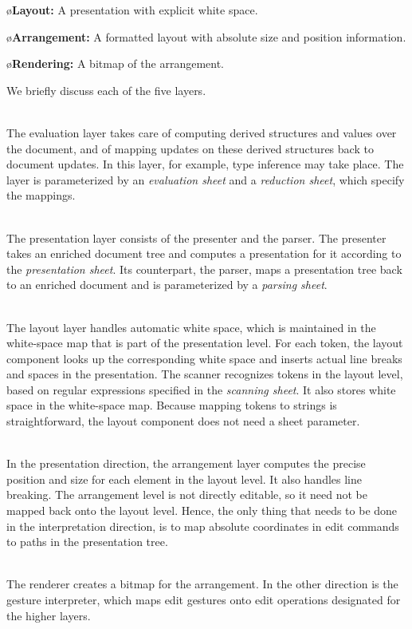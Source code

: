 \documentclass[10pt]{article}
\begin{document}
\o{\bf Layout:} A presentation with explicit white space. 

\o{\bf Arrangement:} A formatted layout with absolute size and position information.

\o{\bf Rendering:} A bitmap of the arrangement.
\el


\bc
We briefly discuss each of the five layers.

\\
The evaluation layer takes care of computing derived structures and values over the document, and of mapping updates on these derived structures back to document updates. In this layer, for example, type inference may take place. The layer is parameterized by an {\em evaluation sheet} and a {\em reduction sheet}, which specify the mappings. 

\\
The presentation layer consists of the presenter and the parser. The presenter takes an enriched document tree and computes a presentation for it according to the {\em presentation sheet}. Its counterpart, the parser, maps a presentation tree back to an enriched document and is parameterized by a {\em parsing sheet}.

\\
The layout layer handles automatic white space, which is maintained in the white-space map that is part of the presentation level. For each token, the layout component looks up the corresponding white space and inserts actual line breaks and spaces in the presentation. The scanner recognizes tokens in the layout level, based on regular expressions specified in the {\em scanning sheet}. It also stores white space in the white-space map. Because mapping tokens to strings is straightforward, the layout component does not need a sheet parameter.

\\
In the presentation direction, the arrangement layer computes the precise position and size for each element in the layout level. It also handles line breaking. The arrangement level is not directly editable, so it need not be mapped back onto the layout level. Hence, the only thing that needs to be done in the interpretation direction, is to map absolute coordinates in edit commands to paths in the presentation tree. 

\\
The renderer creates a bitmap for the arrangement. In the other direction is the gesture interpreter, which maps edit gestures onto edit operations designated for the higher layers.
\end{document}
